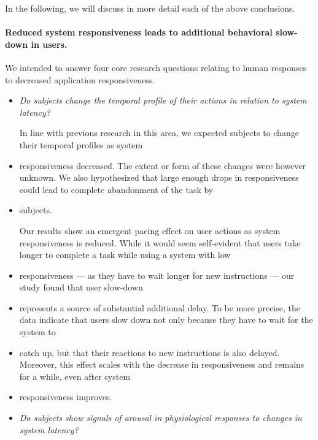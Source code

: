 In the following, we will discuss in more detail each of the above conclusions.

\paragraph{Reduced system responsiveness leads to additional behavioral slow-down in users.}






We intended to answer four core research questions relating to human responses to decreased application responsiveness.

\begin{itemize}
    \item \emph{Do subjects change the temporal profile of their actions in relation to system latency?}

    In line with previous research in this area, we expected subjects to change their temporal profiles as system
    \item responsiveness decreased.
    The extent or form of these changes were however unknown.
    We also hypothesized that large enough drops in responsiveness could lead to complete abandonment of the task by
    \item subjects.

    Our results show an emergent pacing effect on user actions as system responsiveness is reduced.
    While it would seem self-evident that users take longer to complete a task while using a system with low
    \item responsiveness --- as they have to wait longer for new instructions --- our study found that user slow-down
    \item represents a source of substantial additional delay.
    To be more precise, the data indicate that users slow down not only because they have to wait for the system to
    \item catch up, but that their reactions to new instructions is also delayed.
    Moreover, this effect scales with the decrease in responsiveness and remains for a while, even after system
    \item responsiveness improves.

    \item \emph{Do subjects show signals of arousal in physiological responses to changes in system latency?}


\end{itemize}

